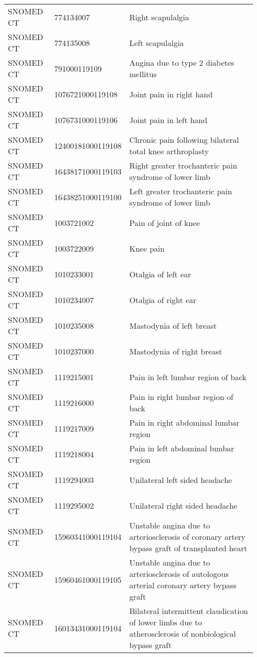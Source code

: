 \begin{longtable}{p{}p{}p{}}
  SNOMED CT & 774134007 & Right scapulalgia \\ 
  SNOMED CT & 774135008 & Left scapulalgia \\ 
  SNOMED CT & 791000119109 & Angina due to type 2 diabetes mellitus \\ 
  SNOMED CT & 1076721000119108 & Joint pain in right hand \\ 
  SNOMED CT & 1076731000119106 & Joint pain in left hand \\ 
  SNOMED CT & 12400181000119108 & Chronic pain following bilateral total knee arthroplasty \\ 
  SNOMED CT & 16438171000119103 & Right greater trochanteric pain syndrome of lower limb \\ 
  SNOMED CT & 16438251000119100 & Left greater trochanteric pain syndrome of lower limb \\ 
  SNOMED CT & 1003721002 & Pain of joint of knee \\ 
  SNOMED CT & 1003722009 & Knee pain \\ 
  SNOMED CT & 1010233001 & Otalgia of left ear \\ 
  SNOMED CT & 1010234007 & Otalgia of right ear \\ 
  SNOMED CT & 1010235008 & Mastodynia of left breast \\ 
  SNOMED CT & 1010237000 & Mastodynia of right breast \\ 
  SNOMED CT & 1119215001 & Pain in left lumbar region of back \\ 
  SNOMED CT & 1119216000 & Pain in right lumbar region of back \\ 
  SNOMED CT & 1119217009 & Pain in right abdominal lumbar region \\ 
  SNOMED CT & 1119218004 & Pain in left abdominal lumbar region \\ 
  SNOMED CT & 1119294003 & Unilateral left sided headache \\ 
  SNOMED CT & 1119295002 & Unilateral right sided headache \\ 
  SNOMED CT & 15960341000119104 & Unstable angina due to arteriosclerosis of coronary artery bypass graft of transplanted heart \\ 
  SNOMED CT & 15960461000119105 & Unstable angina due to arteriosclerosis of autologous arterial coronary artery bypass graft \\ 
  SNOMED CT & 16013431000119104 & Bilateral intermittent claudication of lower limbs due to atherosclerosis of nonbiological bypass graft \\ 

\end{longtable}
